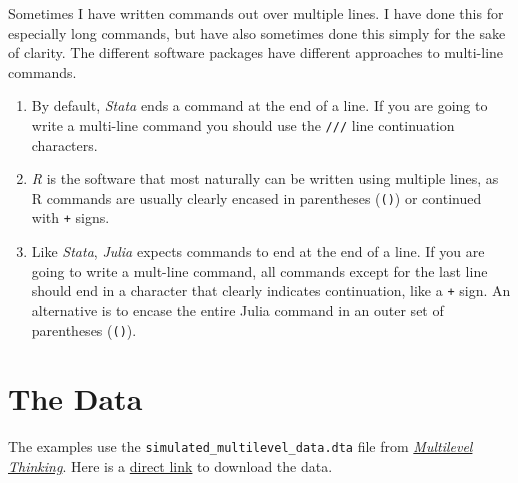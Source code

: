 \documentclass[
  letterpaper,
  DIV=11,
  numbers=noendperiod]{scrreprt}
\providecommand{\tightlist}{%
  \setlength{\itemsep}{0pt}\setlength{\parskip}{0pt}}\usepackage{longtable,booktabs,array}
\begin{document}
\begin{tcolorbox}[enhanced jigsaw, coltitle=black, bottomtitle=1mm, leftrule=.75mm, colframe=quarto-callout-tip-color-frame, left=2mm, opacitybacktitle=0.6, colback=white, rightrule=.15mm, title=\textcolor{quarto-callout-tip-color}{\faLightbulb}\hspace{0.5em}{Multi-Line Commands}, breakable, opacityback=0, toprule=.15mm, toptitle=1mm, titlerule=0mm, arc=.35mm, bottomrule=.15mm, colbacktitle=quarto-callout-tip-color!10!white]

Sometimes I have written commands out over multiple lines. I have done
this for especially long commands, but have also sometimes done this
simply for the sake of clarity. The different software packages have
different approaches to multi-line commands.

\begin{enumerate}
\def\labelenumi{\arabic{enumi}.}
\tightlist
\item
  By default, \emph{Stata} ends a command at the end of a line. If you
  are going to write a multi-line command you should use the
  \texttt{///} line continuation characters.
\item
  \emph{R} is the software that most naturally can be written using
  multiple lines, as R commands are usually clearly encased in
  parentheses (\texttt{()}) or continued with \texttt{+} signs.
\item
  Like \emph{Stata}, \emph{Julia} expects commands to end at the end of
  a line. If you are going to write a mult-line command, all commands
  except for the last line should end in a character that clearly
  indicates continuation, like a \texttt{+} sign. An alternative is to
  encase the entire Julia command in an outer set of parentheses
  (\texttt{()}).
\end{enumerate}

\end{tcolorbox}

\section{The Data}\label{sec-data}

The examples use the \texttt{simulated\_multilevel\_data.dta} file from
\href{https://agrogan1.github.io/multilevel-thinking/simulated-multi-country-data.html}{\emph{Multilevel
Thinking}}. Here is a
\href{https://github.com/agrogan1/multilevel-multilingual/raw/main/simulated_multilevel_data.dta}{direct
link} to download the data.
\end{document}

